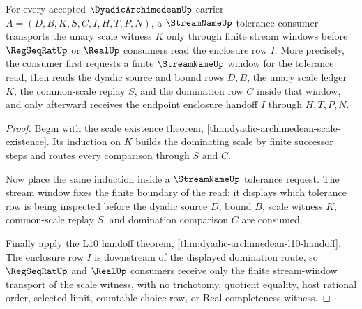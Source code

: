 \begin{theorem}
\label{thm:dyadic-archimedean-streamname-scale-transport}
For every accepted $\DyadicArchimedeanUp$ carrier $A=(D,B,K,S,C,I,H,T,P,N)$, a $\StreamNameUp$ tolerance consumer transports the unary scale witness $K$ only through finite stream windows before $\RegSeqRatUp$ or $\RealUp$ consumers read the enclosure row $I$. More precisely, the consumer first requests a finite $\StreamNameUp$ window for the tolerance read, then reads the dyadic source and bound rows $D,B$, the unary scale ledger $K$, the common-scale replay $S$, and the domination row $C$ inside that window, and only afterward receives the endpoint enclosure handoff $I$ through $H,T,P,N$.
\end{theorem}
\begin{proof}
Begin with the scale existence theorem, \autoref{thm:dyadic-archimedean-scale-existence}. Its induction on $K$ builds the dominating scale by finite successor steps and routes every comparison through $S$ and $C$.

Now place the same induction inside a $\StreamNameUp$ tolerance request. The stream window fixes the finite boundary of the read: it displays which tolerance row is being inspected before the dyadic source $D$, bound $B$, scale witness $K$, common-scale replay $S$, and domination comparison $C$ are consumed.

Finally apply the L10 handoff theorem, \autoref{thm:dyadic-archimedean-l10-handoff}. The enclosure row $I$ is downstream of the displayed domination route, so $\RegSeqRatUp$ and $\RealUp$ consumers receive only the finite stream-window transport of the scale witness, with no trichotomy, quotient equality, host rational order, selected limit, countable-choice row, or Real-completeness witness.
\end{proof}

